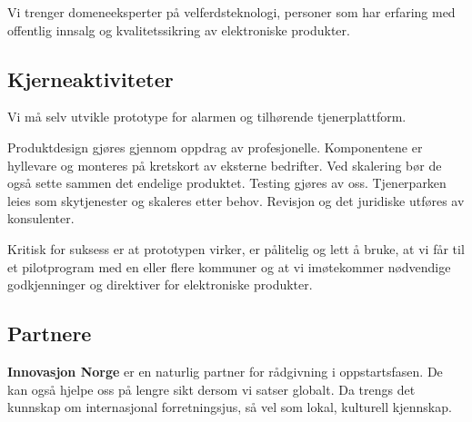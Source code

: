Vi trenger domeneeksperter på velferdsteknologi, personer som har erfaring med
offentlig innsalg og kvalitetssikring av elektroniske produkter.




\subsection{Kjerneaktiviteter}


Vi må selv utvikle prototype for alarmen og tilhørende tjenerplattform.

Produktdesign gjøres gjennom oppdrag av profesjonelle. Komponentene er
hyllevare og monteres på kretskort av eksterne bedrifter. Ved skalering bør de
også sette sammen det endelige produktet. Testing gjøres av oss. Tjenerparken
leies som skytjenester og skaleres etter behov. Revisjon og det juridiske
utføres av konsulenter.

Kritisk for suksess er at prototypen virker, er pålitelig og lett å bruke, at vi
får til et pilotprogram med en eller flere kommuner og at vi imøtekommer
nødvendige godkjenninger og direktiver for elektroniske produkter.

\subsection{Partnere}


\textbf{Innovasjon Norge} er en naturlig partner for rådgivning i
oppstartsfasen. De kan også hjelpe oss på lengre sikt dersom vi satser globalt.
Da trengs det kunnskap om internasjonal forretningsjus, så vel som lokal, kulturell
kjennskap.


